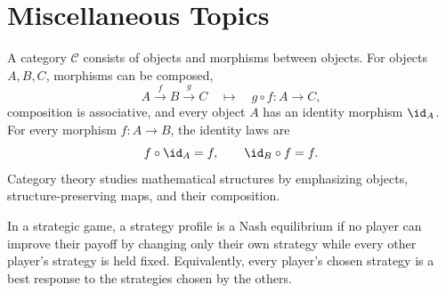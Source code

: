     \chapter{Miscellaneous Topics}

    \relatedcourses{}

    \relatedbooks{}

    \begin{definition}[Category]
        A category $\mathcal{C}$ consists of objects and morphisms between
        objects. For objects $A,B,C$, morphisms can be composed,
        \[
            A\xrightarrow{f}B\xrightarrow{g}C
            \quad\longmapsto\quad
            g\circ f\colon A\to C,
        \]
        composition is associative, and every object $A$ has an identity
        morphism $\id_A$. For every morphism $f\colon A\to B$, the identity laws are
        \[
            f\circ\id_A=f,
            \qquad
            \id_B\circ f=f.
        \]
        Category theory studies mathematical structures by emphasizing objects,
        structure-preserving maps, and their composition.
    \end{definition}

    \begin{definition}
        In a strategic game, a strategy profile is a Nash equilibrium if no
        player can improve their payoff by changing only their own strategy
        while every other player's strategy is held fixed. Equivalently, every
        player's chosen strategy is a best response to the strategies chosen by
        the others.
    \end{definition}

